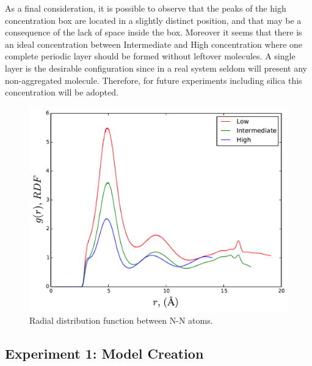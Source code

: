\documentclass[10pt,a4paper,twoside]{article}
\begin{document}
As a final consideration, it is possible to observe that the peaks of the high concentration box are located in a slightly distinct position, and that may be a consequence of the lack of space inside the box. Moreover it seems that there is an ideal concentration between Intermediate and High concentration where one complete periodic layer should be formed without leftover molecules. A single layer is the desirable configuration since in a real system seldom will present any non-aggregated molecule. Therefore, for future experiments including silica this concentration will be adopted.
\begin{figure}[H]
  \begin{center}
	\includegraphics[width=0.7 \textwidth]{./graphs/rdfAA}
	\caption{Radial distribution function between N-N atoms. }
	\label{Fig:rdfAA}
  \end{center}
\end{figure}
\subsection{Experiment 1: Model Creation}
\end{document}
